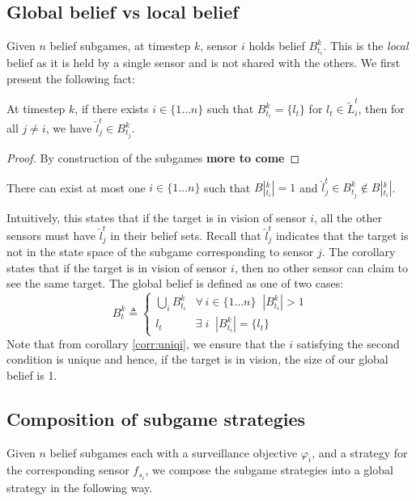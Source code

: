\subsection{Global belief vs local belief}
Given $n$ belief subgames, at timestep $k$, sensor $i$ holds belief $B^k_{t_i}$. This is the \emph{local} belief as it is held by a single sensor and is not shared with the others. We first present the following fact: 
\begin{theorem} 
At timestep $k$, if there exists $i\in \{1\dots n\}$ such that $B^k_{t_i} = \{l_t\}$ for $l_t \in \widetilde{L}_i^t$, then for all $j \neq i$, we have $\hat{l}^t_j \in B^k_{t_j}$.
\end{theorem}
\begin{proof}
By construction of the subgames \textbf{more to come}
\end{proof}
\begin{corollary}\label{corr:uniqi}
There can exist at most one $i\in \{1\dots n\}$ such that $B|^k_{t_i}| = 1$ and $\hat{l}^t_j \in B^k_{t_j} \notin B|^k_{t_i}|$.
\end{corollary}
Intuitively, this states that if the target is in vision of sensor $i$, all the other sensors must have $\hat{l}^t_j$ in their belief sets. Recall that $\hat{l}^t_j$ indicates that the target is not in the state space of the subgame corresponding to sensor $j$. The corollary states that if the target is in vision of sensor $i$, then no other sensor can claim to see the same target. 
The global belief is defined as one of two cases:
\[B^k_t \triangleq \begin{cases}
\bigcup_{i}B^k_{t_i} & \forall \, i \in \{1\dots n\} \;\; |B^k_{t_i}| > 1\\
l_t & \exists \; i \;\; |B^k_{t_i}| = \{l_t\} 
\end{cases}
\]
Note that from corollary \ref{corr:uniqi}, we ensure that the $i$ satisfying the second condition is unique and hence, if the target is in vision, the size of our global belief is 1. 
\subsection{Composition of subgame strategies}
Given $n$ belief subgames each with a surveillance objective $\varphi_i$, and a strategy for the corresponding sensor $f_{s_i}$, we compose the subgame strategies into a global strategy in the following way.


